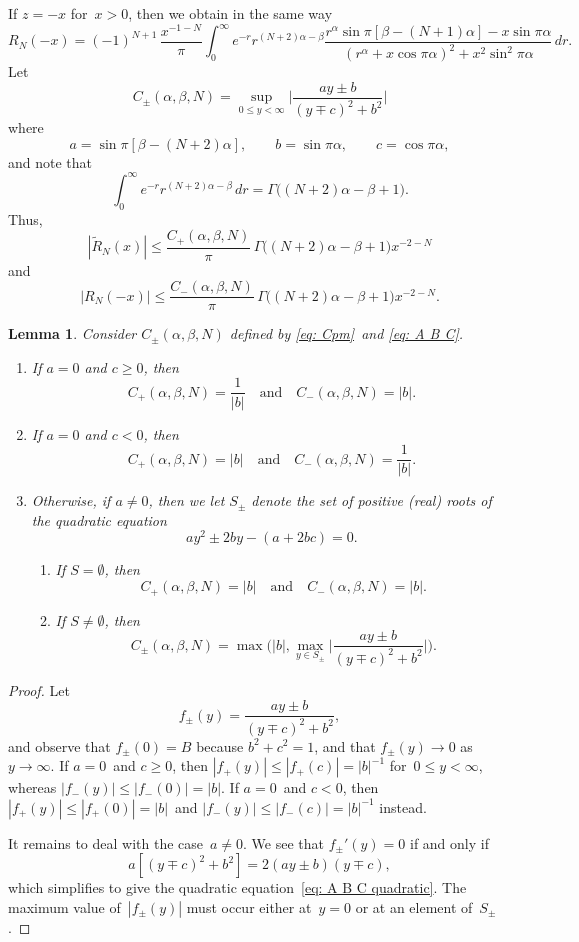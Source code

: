 \documentclass[12pt,a4paper]{article}
\newtheorem{lemma}[theorem]{Lemma}
\begin{document}
If $z=-x$ for~$x>0$, then we obtain in the same way
\[
R_N(-x)=(-1)^{N+1}\,\frac{x^{-1-N}}{\pi}\int_0^\infty 
    e^{-r}r^{(N+2)\alpha-\beta}
    \frac{r^\alpha\sin\pi[\beta-(N+1)\alpha]-x\sin\pi\alpha}%
{(r^\alpha+x\cos\pi\alpha)^2+x^2\sin^2\pi\alpha}\,dr.
\]
Let
\begin{equation}\label{eq: Cpm}
C_\pm(\alpha, \beta, N)=\sup_{0\le y<\infty}
    \biggl|\frac{ay\pm b}{(y\mp c)^2+b^2}\biggr|
\end{equation}
where
\begin{equation}\label{eq: A B C}
a=\sin\pi[\beta-(N+2)\alpha],\qquad b=\sin\pi\alpha,\qquad c=\cos\pi\alpha,
\end{equation}
and note that
\[
\int_0^\infty e^{-r}r^{(N+2)\alpha-\beta}\,dr
    =\Gamma\bigl((N+2)\alpha-\beta+1\bigr).
\]
Thus,
\[
|\tilde R_N(x)|\le\frac{C_+(\alpha,\beta,N)}{\pi}\,
    \Gamma\bigl((N+2)\alpha-\beta+1\bigr)x^{-2-N}
\]
and
\[
|R_N(-x)|\le\frac{C_-(\alpha,\beta,N)}{\pi}\,
    \Gamma\bigl((N+2)\alpha-\beta+1\bigr)x^{-2-N}.
\]

\begin{lemma}
Consider $C_\pm(\alpha,\beta,N)$ defined by \eqref{eq: Cpm}~and 
\eqref{eq: A B C}.
\begin{enumerate}
\item
If $a=0$ and $c\ge0$, then
\[
C_+(\alpha, \beta, N)=\frac{1}{|b|}\quad\text{and}\quad
C_-(\alpha, \beta, N)=|b|.
\]
\item 
If $a=0$ and $c<0$, then
\[
C_+(\alpha, \beta, N)=|b|\quad\text{and}\quad
C_-(\alpha, \beta, N)=\frac{1}{|b|}.
\]
\item
Otherwise, if $a\ne0$, then we let $S_\pm$ denote the set of positive (real) 
roots of the quadratic equation
\begin{equation}\label{eq: A B C quadratic}
ay^2\pm2by-(a+2bc)=0.
\end{equation}
\begin{enumerate}
\item If $S=\emptyset$, then
\[
C_+(\alpha, \beta, N)=|b|\quad\text{and}\quad C_-(\alpha, \beta, N)=|b|.
\]
\item If $S\ne\emptyset$, then
\[
C_\pm(\alpha,\beta,N)=\max\biggl(|b|,
\max_{y\in S_\pm}\biggl|\frac{ay\pm b}{(y\mp c)^2+b^2}\biggr|\biggr).
\]
\end{enumerate}
\end{enumerate}
\end{lemma}
\begin{proof}
Let
\[
f_\pm(y)=\frac{ay\pm b}{(y\mp c)^2+b^2},
\]
and observe that $f_\pm(0)=B$ because $b^2+c^2=1$, and that $f_\pm(y)\to0$ 
as~$y\to\infty$.  If $a=0$~and $c\ge0$, then $|f_+(y)|\le|f_+(c)|=|b|^{-1}$
for~$0\le y<\infty$, whereas $|f_-(y)|\le|f_-(0)|=|b|$.  If $a=0$~and $c<0$,
then $|f_+(y)|\le|f_+(0)|=|b|$~and $|f_-(y)|\le|f_-(c)|=|b|^{-1}$ instead.

It remains to deal with the case~$a\ne0$.  We see that $f_\pm'(y)=0$ if and 
only if
\[
a[(y\mp c)^2+b^2]=2(ay\pm b)(y\mp c),
\]
which simplifies to give the quadratic equation~\eqref{eq: A B C quadratic}.
The maximum value of~$|f_\pm(y)|$ must occur either at~$y=0$ or at an element 
of~$S_\pm$.
\end{proof}


\printbibliography
\end{document}
